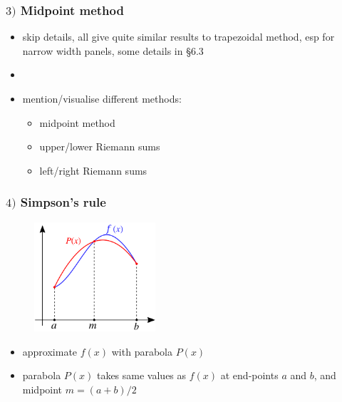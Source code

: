\documentclass[english,14pt]{beamer}
\newcommand\red[1]{{\color{red} #1}}
\newcommand\blue[1]{{\color{blue} #1}}
\begin{document}
\begin{frame}[fragile]

\frametitle{$3)$ Midpoint method}

\begin{itemize}
	\item skip details, all give quite similar results to trapezoidal method, esp for narrow width panels, some details in \red{\S6.3}
	\item[]
	\item mention/visualise different methods:
	\begin{itemize}
		\item midpoint method
		\item upper/lower Riemann sums 
		\item left/right Riemann sums
	\end{itemize}
\end{itemize}

\end{frame}


\begin{frame}[fragile]

\frametitle{$4)$ Simpson's rule}

\begin{figure}[ht]
	\centering
	\includegraphics[width=0.4\textwidth]{figures/SimpsonsRule}
\end{figure}

\begin{itemize}
	\item approximate \blue{$f(x)$} with parabola \red{$P(x)$}
	\item parabola $P(x)$ takes same values as $f(x)$ at end-points $a$ and $b$, and midpoint $m = (a+b)/2$
\end{itemize}

\end{frame}

\end{document}
